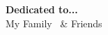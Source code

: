 \thispagestyle{empty}

\vspace*{6.5cm}
 \begin{center}
 \textbf{{{\LARGE{Dedicated to...}}}}\\
 \large{My Family \ \& Friends }
 \end{center}
 